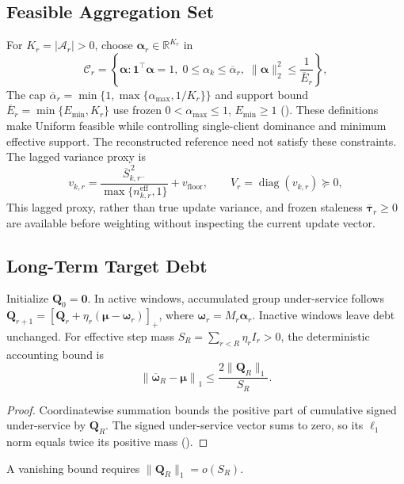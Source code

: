 \documentclass[letterpaper,journal]{IEEEtran}
\begin{document}
\subsection{Feasible Aggregation Set}
\label{subsec:feasible_set}

For $K_r=|\mathcal A_r|>0$, choose $\boldsymbol\alpha_r\in\mathbb R^{K_r}$ in
\begin{equation}
 \mathcal{C}_r
 =
 \left\{
 \boldsymbol\alpha:
 \mathbf{1}^{\top}\boldsymbol\alpha=1,\;
 0\le\alpha_k\le\overline\alpha_r,\;
 \|\boldsymbol\alpha\|_2^2\le\frac{1}{\overline E_r}
 \right\},
 \label{eq:Cr}
\end{equation}
The cap $\overline\alpha_r=\min\{1,\max\{\alpha_{\max},1/K_r\}\}$ and
support bound $\overline E_r=\min\{E_{\min},K_r\}$ use frozen
$0<\alpha_{\max}\le1$, $E_{\min}\ge1$ ().
These definitions make Uniform feasible while controlling single-client
dominance and minimum effective support.  The reconstructed reference need not
satisfy these constraints.  The lagged variance proxy is
\begin{equation}
 v_{k,r}
 =
 \frac{
 \overline S_{k,r^-}^{\,2}
 }{
 \max\{n^{\mathrm{eff}}_{k,r},1\}
 }
 +
 v_{\mathrm{floor}},
 \qquad
 V_r=\operatorname{diag}(v_{k,r})\succeq0,
 \label{eq:variance_proxy}
\end{equation}
This lagged proxy, rather than true update variance, and frozen staleness
$\overline{\boldsymbol\tau}_r\ge0$ are available before weighting without
inspecting the current update vector.

\subsection{Long-Term Target Debt}
\label{subsec:debt}

Initialize $\mathbf Q_0=\mathbf0$.  In active windows, accumulated group
under-service follows
$\mathbf Q_{r+1}=[\mathbf Q_r+\eta_r(\boldsymbol\mu-\boldsymbol\omega_r)]_+$,
where $\boldsymbol\omega_r=M_r\boldsymbol\alpha_r$.  Inactive windows leave
debt unchanged.
For effective step mass $S_R=\sum_{r<R}\eta_r I_r>0$,
the deterministic accounting bound is
\begin{equation}
 \left\|
 \overline{\boldsymbol\omega}_R-\boldsymbol\mu
 \right\|_1
 \le
 \frac{
 2\|\mathbf{Q}_R\|_1
 }{S_R}.
 \label{eq:debt_bound}
\end{equation}
\begin{proof}
Coordinatewise summation bounds the positive part of cumulative signed
under-service by $\mathbf Q_R$. The signed under-service vector sums to zero,
so its $\ell_1$ norm equals twice its positive mass ().
\end{proof}
A vanishing bound requires $\|\mathbf Q_R\|_1=o(S_R)$.
\end{document}
